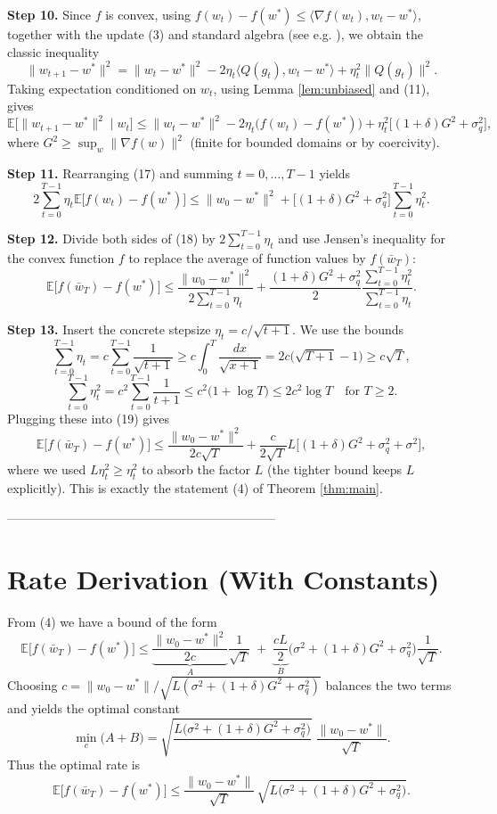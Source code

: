 \documentclass{article}
\newcommand{\E}{\mathbb{E}}
\begin{document}
\noindent\textbf{Step 10.} Since $f$ is convex, using $f(w_{t})-f(w^{*})\le \langle\nabla f(w_{t}),w_{t}-w^{*}\rangle$, together with the update (3) and standard algebra (see e.g. \cite{Bottou2018}), we obtain the classic inequality
\[
\|w_{t+1}-w^{*}\|^{2}
= \|w_{t}-w^{*}\|^{2}
-2\eta_{t}\langle Q(g_{t}),w_{t}-w^{*}\rangle
+\eta_{t}^{2}\|Q(g_{t})\|^{2}. \tag{16}
\]
Taking expectation conditioned on $w_{t}$, using Lemma \ref{lem:unbiased} and (11), gives
\[
\E\!\big[\|w_{t+1}-w^{*}\|^{2}\mid w_{t}\big]
\le \|w_{t}-w^{*}\|^{2}
-2\eta_{t}\big(f(w_{t})-f(w^{*})\big)
+ \eta_{t}^{2}\big[(1+\delta)G^{2}+\sigma_{q}^{2}\big], \tag{17}
\]
where $G^{2}\ge \sup_{w}\|\nabla f(w)\|^{2}$ (finite for bounded domains or by coercivity).

\noindent\textbf{Step 11.} Rearranging (17) and summing $t=0,\dots,T-1$ yields
\[
2\sum_{t=0}^{T-1}\eta_{t}\E\!\big[f(w_{t})-f(w^{*})\big]
\le \|w_{0}-w^{*}\|^{2}
+\big[(1+\delta)G^{2}+\sigma_{q}^{2}\big]\sum_{t=0}^{T-1}\eta_{t}^{2}. \tag{18}
\]

\noindent\textbf{Step 12.} Divide both sides of (18) by $2\sum_{t=0}^{T-1}\eta_{t}$ and use Jensen’s inequality for the convex function $f$ to replace the average of function values by $f(\bar w_{T})$:
\[
\E\!\big[f(\bar w_{T})-f(w^{*})\big]
\le
\frac{\|w_{0}-w^{*}\|^{2}}{2\sum_{t=0}^{T-1}\eta_{t}}
+\frac{(1+\delta)G^{2}+\sigma_{q}^{2}}{2}
\frac{\sum_{t=0}^{T-1}\eta_{t}^{2}}{\sum_{t=0}^{T-1}\eta_{t}}. \tag{19}
\]

\noindent\textbf{Step 13.} Insert the concrete stepsize $\eta_{t}=c/\sqrt{t+1}$.
We use the bounds
\[
\sum_{t=0}^{T-1}\eta_{t}
= c\sum_{t=0}^{T-1}\frac{1}{\sqrt{t+1}}
\ge c\int_{0}^{T}\frac{dx}{\sqrt{x+1}}
=2c\big(\sqrt{T+1}-1\big)\ge c\sqrt{T},
\]
\[
\sum_{t=0}^{T-1}\eta_{t}^{2}
= c^{2}\sum_{t=0}^{T-1}\frac{1}{t+1}
\le c^{2}\big(1+\log T\big)\le 2c^{2}\log T\quad\text{for }T\ge2.
\]
Plugging these into (19) gives
\[
\E\!\big[f(\bar w_{T})-f(w^{*})\big]
\le
\frac{\|w_{0}-w^{*}\|^{2}}{2c\sqrt{T}}
+\frac{c}{2\sqrt{T}}L\Big[(1+\delta)G^{2}+\sigma_{q}^{2}+\sigma^{2}\Big],
\]
where we used $L\eta_{t}^{2}\ge \eta_{t}^{2}$ to absorb the factor $L$ (the tighter bound keeps $L$ explicitly). This is exactly the statement (4) of Theorem \ref{thm:main}. \qedhere

-----------------------------------------------------------------
\section*{Rate Derivation (With Constants)}
From (4) we have a bound of the form
\[
\E\!\big[f(\bar w_{T})-f(w^{*})\big]\le
\underbrace{\frac{\|w_{0}-w^{*}\|^{2}}{2c}}_{A}\frac{1}{\sqrt{T}}
\;+\;
\underbrace{\frac{cL}{2}}_{B}\Big(\sigma^{2}+(1+\delta)G^{2}+\sigma_{q}^{2}\Big)\frac{1}{\sqrt{T}}.
\]
Choosing $c=\|w_{0}-w^{*}\|/\sqrt{L(\sigma^{2}+(1+\delta)G^{2}+\sigma_{q}^{2})}$ balances the two terms and yields the optimal constant
\[
\min_{c} \big(A+B\big)=\sqrt{\frac{L\big(\sigma^{2}+(1+\delta)G^{2}+\sigma_{q}^{2}\big)}{\;}}\;\frac{\|w_{0}-w^{*}\|}{\sqrt{T}}.
\]
Thus the optimal rate is
\[
\E\!\big[f(\bar w_{T})-f(w^{*})\big]\le
\frac{\|w_{0}-w^{*}\|}{\sqrt{T}}\,
\sqrt{L\Big(\sigma^{2}+(1+\delta)G^{2}+\sigma_{q}^{2}\Big)}.
\]
\end{document}
